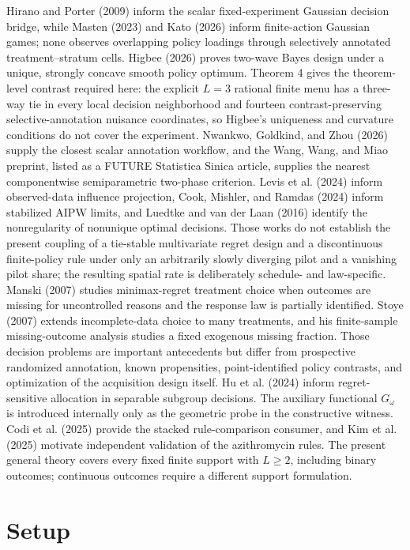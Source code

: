\documentclass{article}
\begin{document}
Hirano and Porter (2009) inform the scalar fixed-experiment Gaussian decision bridge, while Masten (2023) and Kato (2026) inform finite-action Gaussian games; none observes overlapping policy loadings through selectively annotated treatment--stratum cells. Higbee (2026) proves two-wave Bayes design under a unique, strongly concave smooth policy optimum. Theorem 4 gives the theorem-level contrast required here: the explicit \(L=3\) rational finite menu has a three-way tie in every local decision neighborhood and fourteen contrast-preserving selective-annotation nuisance coordinates, so Higbee's uniqueness and curvature conditions do not cover the experiment. Nwankwo, Goldkind, and Zhou (2026) supply the closest scalar annotation workflow, and the Wang, Wang, and Miao preprint, listed as a FUTURE Statistica Sinica article, supplies the nearest componentwise semiparametric two-phase criterion. Levis et al. (2024) inform observed-data influence projection, Cook, Mishler, and Ramdas (2024) inform stabilized AIPW limits, and Luedtke and van der Laan (2016) identify the nonregularity of nonunique optimal decisions. Those works do not establish the present coupling of a tie-stable multivariate regret design and a discontinuous finite-policy rule under only an arbitrarily slowly diverging pilot and a vanishing pilot share; the resulting spatial rate is deliberately schedule- and law-specific. Manski (2007) studies minimax-regret treatment choice when outcomes are missing for uncontrolled reasons and the response law is partially identified. Stoye (2007) extends incomplete-data choice to many treatments, and his finite-sample missing-outcome analysis studies a fixed exogenous missing fraction. Those decision problems are important antecedents but differ from prospective randomized annotation, known propensities, point-identified policy contrasts, and optimization of the acquisition design itself. Hu et al. (2024) inform regret-sensitive allocation in separable subgroup decisions. The auxiliary functional \(G_\omega\) is introduced internally only as the geometric probe in the constructive witness. Codi et al. (2025) provide the stacked rule-comparison consumer, and Kim et al. (2025) motivate independent validation of the azithromycin rules. The present general theory covers every fixed finite support with \(L\ge2\), including binary outcomes; continuous outcomes require a different support formulation.

\section{Setup}
\end{document}
